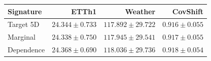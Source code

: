 \begin{tabular}{lrrr}
\toprule
Signature & ETTh1 & Weather & CovShift \\
\midrule
Target 5D & $24.344\pm0.733$ & $117.892\pm29.722$ & $0.916\pm0.055$ \\
Marginal & $24.338\pm0.750$ & $117.945\pm29.541$ & $0.917\pm0.055$ \\
Dependence & $24.368\pm0.690$ & $118.036\pm29.736$ & $0.918\pm0.054$ \\
\bottomrule
\end{tabular}
